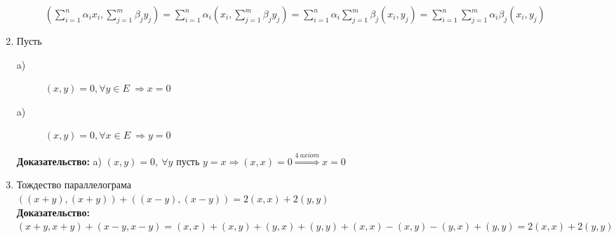 \begin{enumerate}
\begin{description}
		$\left( \sum \limits_{i=1}^n {\alpha_ix_i} , \sum \limits_{j=1}^m {\beta_jy_j} \right)  
		= \sum \limits_{i=1}^n \alpha_i \left(x_i, \sum \limits_{j=1}^m {\beta_jy_j} \right)
		= \sum \limits_{i=1}^n \alpha_i \sum \limits_{j=1}^m \beta_j \left(x_i,y_j \right)
		= \sum \limits_{i=1}^n \sum \limits_{j=1}^m \alpha_i \beta_j \left(x_i,y_j \right)$
		
         \end{description}
   \item Пусть \begin{description}
                \item [a)] $\left( x,y \right) = 0, \forall y \in E\ \Rightarrow x=0 $ 
                \item [a)] $\left( x,y \right) = 0, \forall x \in E\ \Rightarrow y=0 $
               \end{description}
	 \textbf{Доказательство: } a) $\left( x,y \right)=0, \  \forall y $ пусть $y=x \Rightarrow \left( x,x \right) = 0 \stackrel{4 \ axiom}{\Rightarrow} x=0$ \\
   \item Тождество параллелограма \\
	 $\left( \left( x+y \right),\left( x+y \right) \right) + \left( \left( x-y \right),\left( x-y \right) \right) = 
	 2\left( x,x \right) + 2\left( y,y \right) $ \\
	 \textbf{Доказательство: } \\
	 $\left( x+y,x+y \right) + \left( x-y,x-y \right) = \left( x,x \right) + \left( x,y \right) + \left( y,x \right) + \left( y,y \right) +
	 \left( x,x \right) - \left( x,y \right) - \left( y,x \right) + \left( y,y \right) =2\left( x,x \right) + 2\left( y,y \right) $
  \end{enumerate}




